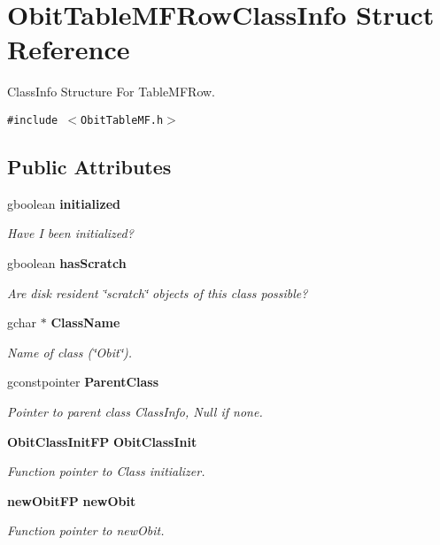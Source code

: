 \section{Obit\-Table\-MFRow\-Class\-Info Struct Reference}
\label{structObitTableMFRowClassInfo}
Class\-Info Structure For Table\-MFRow.  


{\tt \#include $<$Obit\-Table\-MF.h$>$}

\subsection*{Public Attributes}
\begin{CompactItemize}
\item 
gboolean {\bf initialized}
\begin{CompactList}\small\item\em Have I been initialized? \item\end{CompactList}\item 
gboolean {\bf has\-Scratch}
\begin{CompactList}\small\item\em Are disk resident \char`\"{}scratch\char`\"{} objects of this class possible? \item\end{CompactList}\item 
gchar $\ast$ {\bf Class\-Name}
\begin{CompactList}\small\item\em Name of class (\char`\"{}Obit\char`\"{}). \item\end{CompactList}\item 
gconstpointer {\bf Parent\-Class}
\begin{CompactList}\small\item\em Pointer to parent class Class\-Info, Null if none. \item\end{CompactList}\item 
{\bf Obit\-Class\-Init\-FP} {\bf Obit\-Class\-Init}
\begin{CompactList}\small\item\em Function pointer to Class initializer. \item\end{CompactList}\item 
{\bf new\-Obit\-FP} {\bf new\-Obit}
\begin{CompactList}\small\item\em Function pointer to new\-Obit. \item\end{CompactList}\item 

\end{CompactItemize}
